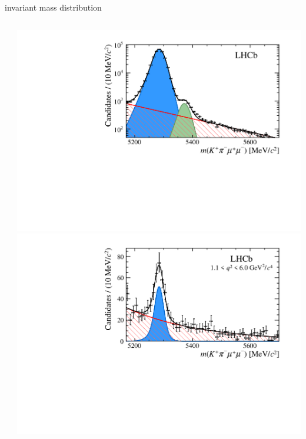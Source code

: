 \documentclass[aspectratio=1610]{beamer}
\begin{document}
\begin{frame}{\mkpimm invariant mass distribution}
\begin{columns}
\begin{column}{0.61\textwidth}
\end{column}
\begin{column}{0.39\textwidth}
\includegraphics[width=\textwidth]{figs/kpimm/massfit/fit_jpsi_log.pdf}\\
\includegraphics[width=\textwidth]{figs/kpimm/massfit/fitKpimumu_q2_1p1_6p0.pdf}
\end{column}
\end{columns}
\end{frame}
\end{document}
